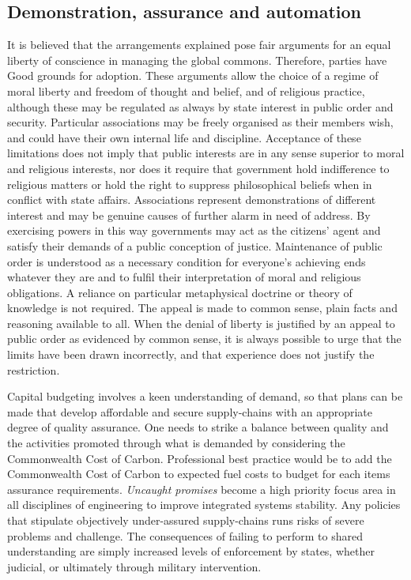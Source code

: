 \documentclass[11pt, oneside]{article}   	%
\begin{document}
\subsection{Demonstration, assurance and automation}
It is believed that the arrangements explained pose fair arguments for an equal liberty of conscience in managing the global commons.
Therefore, parties have Good grounds for adoption.
These arguments allow the choice of a regime of moral liberty and freedom of thought and belief, and of religious practice, although these may be regulated as always by state interest in public order and security.
Particular associations may be freely organised as their members wish, and could have their own internal life and discipline.
Acceptance of these limitations does not imply that public interests are in any sense superior to moral and religious interests, nor does it require that government hold indifference to religious matters or hold the right to suppress philosophical beliefs when in conflict with state affairs.
Associations represent demonstrations of different interest and may be genuine causes of further alarm in need of address.
By exercising powers in this way governments may act as the citizens' agent and satisfy their demands of a public conception of justice.
Maintenance of public order is understood as a necessary condition for everyone's achieving ends whatever they are and to fulfil their interpretation of moral and religious obligations.
A reliance on particular metaphysical doctrine or theory of knowledge is not required.
The appeal is made to common sense, plain facts and reasoning available to all.
When the denial of liberty is justified by an appeal to public order as evidenced by common sense, it is always possible to urge that the limits have been drawn incorrectly, and that experience does not justify the restriction.\

Capital budgeting involves a keen understanding of demand, so that plans can be made that develop affordable and secure supply-chains with an appropriate degree of quality assurance.
One needs to strike a balance between quality and the activities promoted through what is demanded by considering the Commonwealth Cost of Carbon.
Professional best practice would be to add the Commonwealth Cost of Carbon to expected fuel costs to budget for each items assurance requirements.
\emph{Uncaught promises} become a high priority focus area in all disciplines of engineering to improve integrated systems stability.
Any policies that stipulate objectively under-assured supply-chains runs risks of severe problems and challenge.
The consequences of failing to perform to shared understanding are simply increased levels of enforcement by states, whether judicial, or ultimately through military intervention.\
\end{document}
